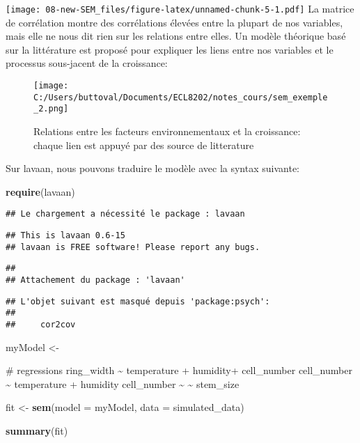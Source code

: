 \documentclass[
]{article}
\newenvironment{Shaded}{\begin{snugshade}}{\end{snugshade}}
\newcommand{\AttributeTok}[1]{\textcolor[rgb]{0.13,0.29,0.53}{#1}}
\newcommand{\FunctionTok}[1]{\textcolor[rgb]{0.13,0.29,0.53}{\textbf{#1}}}
\newcommand{\NormalTok}[1]{#1}
\newcommand{\OtherTok}[1]{\textcolor[rgb]{0.56,0.35,0.01}{#1}}
\newcommand{\StringTok}[1]{\textcolor[rgb]{0.31,0.60,0.02}{#1}}
\begin{document}
\texttt{[image: 08-new-SEM\_files/figure-latex/unnamed-chunk-5-1.pdf]} La
matrice de corrélation montre des corrélations élevées entre la plupart
de nos variables, mais elle ne nous dit rien sur les relations entre
elles. Un modèle théorique basé sur la littérature est proposé pour
expliquer les liens entre nos variables et le processus sous-jacent de
la croissance:

\begin{figure}
\centering
\texttt{[image: C:/Users/buttoval/Documents/ECL8202/notes\_cours/sem\_exemple\_2.png]}
\caption{Relations entre les facteurs environnementaux et la croissance:
chaque lien est appuyé par des source de litterature}
\end{figure}

Sur lavaan, nous pouvons traduire le modèle avec la syntax suivante:

\begin{Shaded}
\begin{Highlighting}[]
\FunctionTok{require}\NormalTok{(lavaan)}
\end{Highlighting}
\end{Shaded}

\begin{verbatim}
## Le chargement a nécessité le package : lavaan
\end{verbatim}

\begin{verbatim}
## This is lavaan 0.6-15
## lavaan is FREE software! Please report any bugs.
\end{verbatim}

\begin{verbatim}
## 
## Attachement du package : 'lavaan'
\end{verbatim}

\begin{verbatim}
## L'objet suivant est masqué depuis 'package:psych':
## 
##     cor2cov
\end{verbatim}

\begin{Shaded}
\begin{Highlighting}[]
\NormalTok{myModel }\OtherTok{\textless{}{-}} \StringTok{\textquotesingle{} }

\StringTok{ \# regressions}
\StringTok{   ring\_width \textasciitilde{} temperature + humidity+ cell\_number}
\StringTok{   cell\_number \textasciitilde{}  temperature + humidity }
\StringTok{   cell\_number \textasciitilde{} \textasciitilde{}  stem\_size }

\StringTok{\textquotesingle{}}

\NormalTok{fit }\OtherTok{\textless{}{-}} \FunctionTok{sem}\NormalTok{(}\AttributeTok{model =}\NormalTok{ myModel, }
           \AttributeTok{data =}\NormalTok{ simulated\_data)}

\FunctionTok{summary}\NormalTok{(fit)}
\end{Highlighting}
\end{Shaded}
\end{document}
